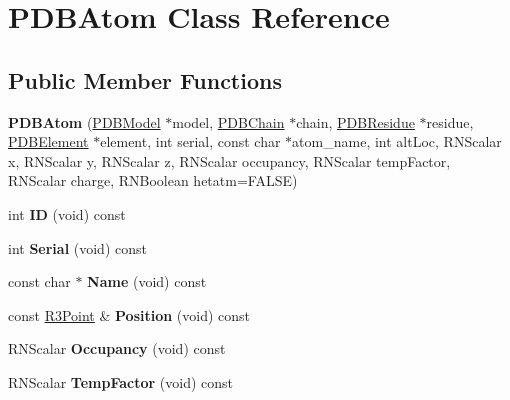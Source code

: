 \hypertarget{class_p_d_b_atom}{}\section{P\+D\+B\+Atom Class Reference}
\label{class_p_d_b_atom}
\subsection*{Public Member Functions}
\begin{DoxyCompactItemize}
\item 
{\bfseries P\+D\+B\+Atom} (\hyperlink{class_p_d_b_model}{P\+D\+B\+Model} $\ast$model, \hyperlink{class_p_d_b_chain}{P\+D\+B\+Chain} $\ast$chain, \hyperlink{class_p_d_b_residue}{P\+D\+B\+Residue} $\ast$residue, \hyperlink{class_p_d_b_element}{P\+D\+B\+Element} $\ast$element, int serial, const char $\ast$atom\+\_\+name, int alt\+Loc, R\+N\+Scalar x, R\+N\+Scalar y, R\+N\+Scalar z, R\+N\+Scalar occupancy, R\+N\+Scalar temp\+Factor, R\+N\+Scalar charge, R\+N\+Boolean hetatm=F\+A\+L\+SE)\hypertarget{class_p_d_b_atom_aa9a6523601a75137e641e4242ff61f33}{}\label{class_p_d_b_atom_aa9a6523601a75137e641e4242ff61f33}

\item 
int {\bfseries ID} (void) const \hypertarget{class_p_d_b_atom_a9ef521219ef174a940e96a7023829f9c}{}\label{class_p_d_b_atom_a9ef521219ef174a940e96a7023829f9c}

\item 
int {\bfseries Serial} (void) const \hypertarget{class_p_d_b_atom_a09fedbd0e002f617f011a5734c36ae09}{}\label{class_p_d_b_atom_a09fedbd0e002f617f011a5734c36ae09}

\item 
const char $\ast$ {\bfseries Name} (void) const \hypertarget{class_p_d_b_atom_aa64ed4c49b883eae9380da186dcff5cc}{}\label{class_p_d_b_atom_aa64ed4c49b883eae9380da186dcff5cc}

\item 
const \hyperlink{class_r3_point}{R3\+Point} \& {\bfseries Position} (void) const \hypertarget{class_p_d_b_atom_a7dbfe503d25ac168f5f788efb38664ad}{}\label{class_p_d_b_atom_a7dbfe503d25ac168f5f788efb38664ad}

\item 
R\+N\+Scalar {\bfseries Occupancy} (void) const \hypertarget{class_p_d_b_atom_a39559c17cc967e77e070378d5a4cc807}{}\label{class_p_d_b_atom_a39559c17cc967e77e070378d5a4cc807}

\item 
R\+N\+Scalar {\bfseries Temp\+Factor} (void) const \hypertarget{class_p_d_b_atom_a83eaa34f4e3c3e1efbc4cc7d2878240f}{}\label{class_p_d_b_atom_a83eaa34f4e3c3e1efbc4cc7d2878240f}


\end{DoxyCompactItemize}
